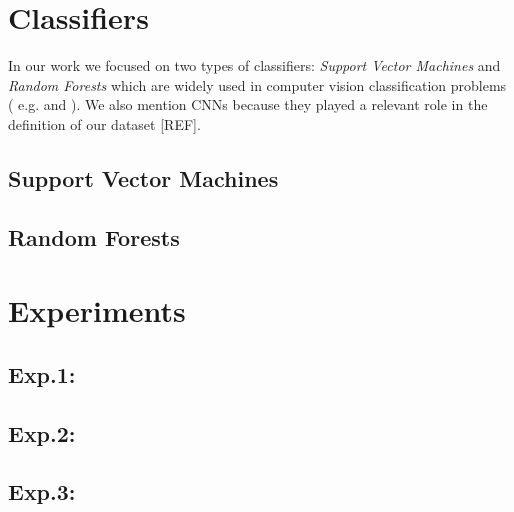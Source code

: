 \vspace{0.5cm}


\section{Classifiers}

In our work we focused on two types of classifiers: \textit{Support Vector Machines} and \textit{Random Forests}
which are widely used in computer vision classification problems ( e.g. \cite{mitosisDetectionLearningBased} and \cite{randForests04}).
We also mention \Glspl{CNN} because they played a relevant role in the definition of our dataset [REF].


\vspace{0.5cm}

\subsection{Support Vector Machines}




\vspace{0.5cm}

\subsection{Random Forests}




\vspace{0.5cm}


\section{Experiments}



\vspace{0.5cm}

\subsection{Exp.1: }


\vspace{0.5cm}

\subsection{Exp.2: }


\vspace{0.5cm}

\subsection{Exp.3: }


